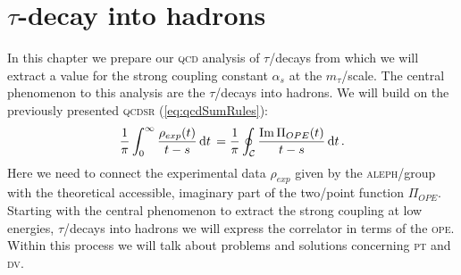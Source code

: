 \documentclass[../../index.tex]{subfiles}
\begin{document}
\chapter{$\tau$-decay into hadrons}
In this chapter we prepare our \textsc{qcd} analysis of $\tau$\-/decays from which we will extract a value for the strong coupling constant
$\alpha_s$ at the $m_\tau$\-/scale. The central phenomenon to this analysis are
the $\tau$\-/decays into hadrons. We will build on the previously presented
\textsc{qcdsr} (\cref{eq:qcdSumRules}):
\begin{equation}
  \frac{1}{\pi}\int_0^\infty \frac{\rho_{exp}(t)}{t-s} \dif t = \frac{1}{\pi} \oint_{\mathcal{C}} \frac{\Ima \Pi_{OPE}(t)}{t-s} \dif t.
\end{equation}
Here we need to connect the experimental data $\rho_{exp}$ given by the
\textsc{aleph}\-/group with the theoretical accessible, imaginary part of the
two\-/point function $\Pi_{OPE}$. Starting with the central phenomenon to extract
the strong coupling at low energies, $\tau$\-/decays into hadrons we will
express the correlator in terms of the \textsc{ope}. Within this process we will
talk about problems and solutions concerning \textsc{pt} and \textsc{dv}.
\end{document}
